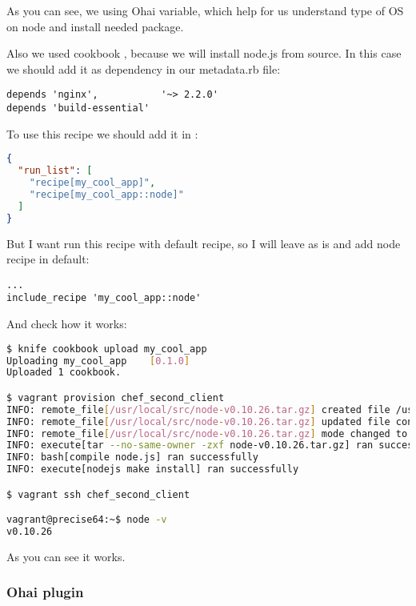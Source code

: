 As you can see, we using  Ohai variable, which help for us understand type of OS on node and install needed package.

Also we used cookbook , because we will install node.js from source. In this case we should add it as dependency in our metadata.rb file:

\begin{lstlisting}[label=lst:cookbook-ohai-meta]
depends 'nginx',           '~> 2.2.0'
depends 'build-essential'
\end{lstlisting}

To use this recipe we should add it in :

\begin{lstlisting}[language=JSON,label=lst:cookbook-ohai2]
{
  "run_list": [
    "recipe[my_cool_app]",
    "recipe[my_cool_app::node]"
  ]
}
\end{lstlisting}

But I want run this recipe with default recipe, so I will leave  as is and add node recipe in default:

\begin{lstlisting}[label=lst:cookbook-ohai3]
...
include_recipe 'my_cool_app::node'
\end{lstlisting}

And check how it works:

\begin{lstlisting}[language=Bash,label=lst:cookbook-ohai4]
$ knife cookbook upload my_cool_app
Uploading my_cool_app    [0.1.0]
Uploaded 1 cookbook.

$ vagrant provision chef_second_client
INFO: remote_file[/usr/local/src/node-v0.10.26.tar.gz] created file /usr/local/src/node-v0.10.26.tar.gz
INFO: remote_file[/usr/local/src/node-v0.10.26.tar.gz] updated file contents /usr/local/src/node-v0.10.26.tar.gz
INFO: remote_file[/usr/local/src/node-v0.10.26.tar.gz] mode changed to 644
INFO: execute[tar --no-same-owner -zxf node-v0.10.26.tar.gz] ran successfully
INFO: bash[compile node.js] ran successfully
INFO: execute[nodejs make install] ran successfully

$ vagrant ssh chef_second_client

vagrant@precise64:~$ node -v
v0.10.26
\end{lstlisting}

As you can see it works.

\subsubsection{Ohai plugin}

